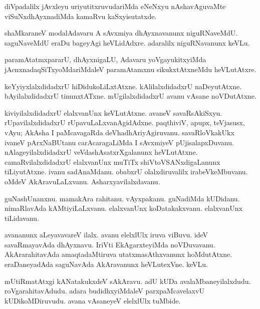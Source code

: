 \documentclass{article}
\begin{document}
\begin{mn}%
diVpadalilx jAvxleyu uriyutitxruvudariMda eNeNxyu nAshavAguvaMte viSuNxdhAyxnadiMda 
kamaRvu kaSxyisutatxde.
\end{mn}

\begin{mn}%
shaMkaraneV modalAdavaru A sAvxmiya dhAyxnavanunx niguRNaveMdU. saguNaveMdU eraDu bageyAgi 
heVLidAdxre. adaralilx niguRNavanunx keVLu.
\end{mn}

\begin{mn}%
paramAtatmxpararU, dhAyxnigaLU, Adavaru yoVgayukitxyiMda jAcnxnadaqSiTxyoMdariMdaleV 
paramAtamxnu sikukxtAtxneMdu heVLutAtxre.
\end{mn}

\begin{mn}%
keYyiyxlalxdidadxrU hiDidukoLiLxtAtxne. kAlilalxdidadxrU naDeyutAtxne. bAyilalxdidadxrU 
tinunxtATxne. mUgilalxdidadxrU avanu vAsane noVDutAtxne.
\end{mn}

\begin{mn}%
kiviyilalxdidadxrU elalxvanUnx keVLutAtxne. avaneV savaRsAkiSxyu. rUpavilalxdidadxrU 
rUpavuLaLxvanAgidAdxne. paqthiviV, apupx, teVjasusx, vAyu; AkAsha I paMcavagaRda 
deVhadhAriyAgiruvanu. savaRloVkakUkx ivaneV pArxNaBUtanu carAcaragaLiMda I sAvxmiyeV 
pUjisalapxDuvanu. nAlageyilalxdidadxrU veVdashAsatxrXgalanunx heVLutAtxne. 
camaRvilalxdidadxrU elalxvanUnx muTiTx shiVtoVSANxdigaLanunx tiLiyutAtxne. ivanu 
sadAnaMdanu. obabxrU olalxdiruvalilx irabeVkeMbuvanu. oMdeV AkAravuLaLxvanu. 
Asharxyavilalxdavanu.
\end{mn}

\begin{mn}%
guNashUnanxnu. mamakAra rahitanu. vAyxpakanu. guNadiMda kUDidanu. nimaRlavAda 
kAMtiyiLaLxvanu. elalxvanUnx koDatakakxvanu. elalxvanUnx tiLidavanu.
\end{mn}

\begin{mn}%
avananunx aLeyavavareV ilalx. avanu elelxlUlx iruva viBuvu. ideV savaRmayavAda dhAyxnavu. 
IriVti EkAgarxteyiMda noVDuvavanu. AkArarahitavAda amaqtadaMtiruva utatxmasAthxvanunx 
hoMdutAtxne. eraDaneyadAda saguNavAda AkAravanunx heVLutexVne. keVLu.
\end{mn}

\begin{mn}%
mUtiRmatAtxgi kANatakukxdeV sAkAravu. adU kUDa avalaMbaneyilalxdudu. roVgarahitavAdudu. 
adara budidhxyiMdaleV parxpaMcavelaxvU kUDikoMDiruvudu. avana vAsaneyeV elelxlUlx tuMbide.
\end{mn}
\end{document}
